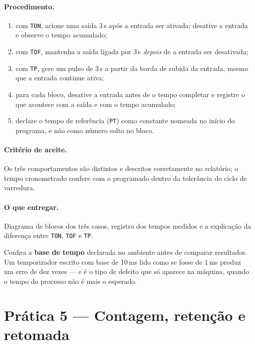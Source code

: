 \paragraph{Procedimento.}
\begin{enumerate}
  \item com \texttt{TON}, acione uma saída 3\,s após a entrada ser ativada; desative a entrada e
        observe o tempo acumulado;
  \item com \texttt{TOF}, mantenha a saída ligada por 3\,s \emph{depois} de a entrada ser desativada;
  \item com \texttt{TP}, gere um pulso de 3\,s a partir da borda de subida da entrada, mesmo que a
        entrada continue ativa;
  \item para cada bloco, desative a entrada antes de o tempo completar e registre o que acontece com
        a saída e com o tempo acumulado;
  \item declare o tempo de referência (\texttt{PT}) como constante nomeada no início do programa, e
        não como número solto no bloco.
\end{enumerate}

\paragraph{Critério de aceite.} Os três comportamentos são distintos e descritos corretamente no
relatório; o tempo cronometrado confere com o programado dentro da tolerância do ciclo de varredura.

\paragraph{O que entregar.} Diagrama de blocos dos três casos, registro dos tempos medidos e a
explicação da diferença entre \texttt{TON}, \texttt{TOF} e \texttt{TP}.

\begin{atencao}
Confira a \textbf{base de tempo} declarada no ambiente antes de comparar resultados. Um temporizador
escrito com base de 10\,ms lido como se fosse de 1\,ms produz um erro de dez vezes --- e é o tipo de
defeito que só aparece na máquina, quando o tempo do processo não é mais o esperado.
\end{atencao}

\section{Prática 5 --- Contagem, retenção e retomada}

